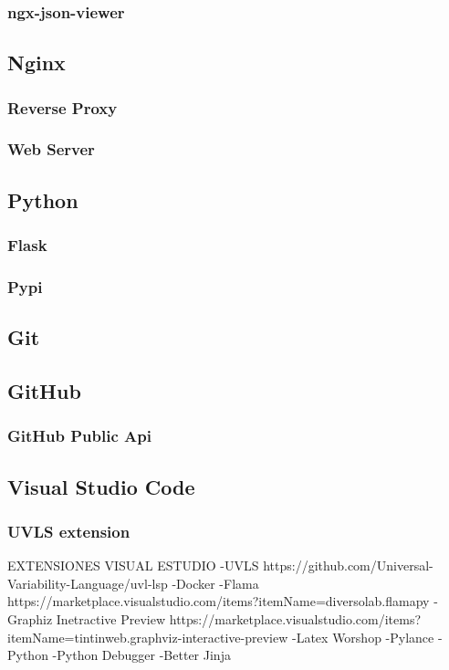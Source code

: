 \documentclass[12pt, a4paper, twoside]{article}
\begin{document}
\subsubsection{ngx-json-viewer}

\subsection{Nginx}
\subsubsection{Reverse Proxy}
\subsubsection{Web Server}

\subsection{Python}
\subsubsection{Flask}
\subsubsection{Pypi}

\subsection{Git}
\subsection{GitHub}
\subsubsection{GitHub Public Api}
\blindtext

\subsection{Visual Studio Code}
\subsubsection{UVLS extension}
EXTENSIONES VISUAL ESTUDIO
	-UVLS https://github.com/Universal-Variability-Language/uvl-lsp
	-Docker
	-Flama https://marketplace.visualstudio.com/items?itemName=diversolab.flamapy
	-Graphiz Inetractive Preview https://marketplace.visualstudio.com/items?itemName=tintinweb.graphviz-interactive-preview
	-Latex Worshop
	-Pylance
	-Python
	-Python Debugger
	-Better Jinja
\end{document}
